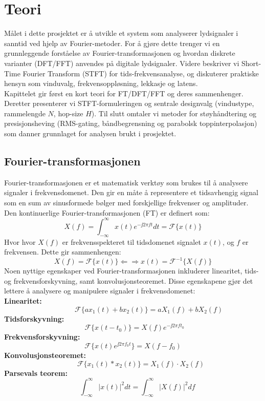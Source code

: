 \section{Teori}
Målet i dette prosjektet er å utvikle et system som analyserer lydsignaler i sanntid ved hjelp av Fourier-metoder. For å gjøre dette trenger vi en grunnleggende forståelse av Fourier-transformasjonen og hvordan diskrete varianter (DFT/FFT) anvendes på digitale lydsignaler. Videre beskriver vi Short-Time Fourier Transform (STFT) for tids-frekvensanalyse, og diskuterer praktiske hensyn som vinduvalg, frekvensoppløsning, lekkasje og latens.\\[1em]
Kapittelet gir først en kort teori for FT/DFT/FFT og deres sammenhenger. Deretter presenterer vi STFT-formuleringen og sentrale designvalg (vindustype, rammelengde $N$, hop-size $H$). Til slutt omtaler vi metoder for støyhåndtering og presisjonsheving (RMS-gating, båndbegrensning og parabolsk toppinterpolasjon) som danner grunnlaget for analysen brukt i prosjektet.
\subsection{Fourier-transformasjonen}
Fourier-transformasjonen er et matematisk verktøy som brukes til å analysere signaler i frekvensdomenet. Den gir en måte å representere et tidsavhengig signal som en sum av sinusformede bølger med forskjellige frekvenser og amplituder. Den kontinuerlige Fourier-transformasjonen (FT) er definert som:
\begin{equation}
X(f) = \int_{-\infty}^{\infty} x(t) e^{-\jj 2 \pi f t} dt = \mathcal{F}\{x(t)\}
\end{equation}
Hvor hvor $X(f)$ er frekvensspekteret til tidsdomenet signalet $x(t)$, og $f$ er frekvensen. Dette gir sammenhengen:
\[
    X(f) = \mathcal{F}\{x(t)\} \Leftarrow \Rightarrow x(t) = \mathcal{F}^{-1}\{X(f)\}
\]
Noen nyttige egenskaper ved Fourier-transformasjonen inkluderer linearitet, tids- og frekvensforskyvning, samt konvolusjonsteoremet. Disse egenskapene gjør det lettere å analysere og manipulere signaler i frekvensdomenet:\\
\textbf{Linearitet:} 
\[
    \qquad  \qquad \ \ \mathcal{F}\{a x_1(t) + b x_2(t)\} = a X_1(f) + b X_2(f)
\]
\textbf{Tidsforskyvning:}
\[
    \ \ \mathcal{F}\{x(t - t_0)\} = X(f) e^{-\jj 2 \pi f t_0}
\]
\textbf{Frekvensforskyvning:} 
\[
    \mathcal{F}\{x(t) e^{\jj 2 \pi f_0 t}\} = X(f - f_0)
\]
\textbf{Konvolusjonsteoremet:} 
\[
    \qquad \ \mathcal{F}\{x_1(t) * x_2(t)\} = X_1(f) \cdot X_2(f)
\]
\textbf{Parsevals teorem:} 
\[
    \ \quad \int_{-\infty}^{\infty} |x(t)|^2 dt = \int_{-\infty}^{\infty} |X(f)|^2 df
\]
